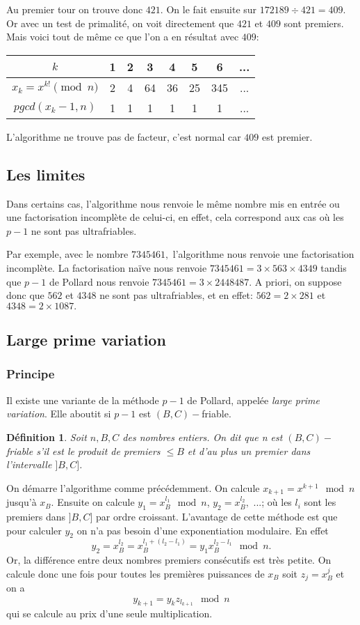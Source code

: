 \documentclass[french, 12pt, titlepage]{article}
\newtheorem{definition}{D{\'e}finition}
\begin{document}
Au premier tour on trouve donc $421.$ On le fait ensuite sur $172189 \div 421 = 409.$ Or avec un test de primalité, on voit directement que $421$ et $409$ sont premiers. Mais voici tout de même ce que l'on a en résultat avec $409:$ 

\begin{center}
\begin{tabular}{|c||c|c|c|c|c|c|c|}
\hline
$k$ & 1 & 2 & 3 & 4 & 5 & 6 & ... \\
\hline
$x_k = x^{k!} \pmod n$ & 2 & 4 & 64 & 36 & 25 & 345 & ... \\
\hline
$pgcd(x_k -1, n)$ & 1 & 1 & 1 & 1 & 1 & 1 & ...\\
\hline
\end{tabular}
\end{center}

L'algorithme ne trouve pas de facteur, c'est normal car $409$ est premier.

\subsection{Les limites}

Dans certains cas, l'algorithme nous renvoie le même nombre mis en entrée ou une factorisation incomplète de celui-ci, en effet, cela correspond aux cas où les $p-1$ ne sont pas ultrafriables.

Par exemple, avec le nombre $7345461,$ l'algorithme nous renvoie une factorisation incomplète.
La factorisation naïve nous renvoie $7345461 = 3 \times 563 \times 4349$ tandis que $p-1$ de Pollard nous renvoie $7345461 = 3 \times 2448487.$
A priori, on suppose donc que $562$ et $4348$ ne sont pas ultrafriables, et en effet:
$562 = 2 \times 281$ et $4348 = 2 \times 1087.$

\subsection{Large prime variation}
\subsubsection{Principe}
Il existe une variante de la méthode $p - 1$ de Pollard, appelée \textit{large prime variation}. 
Elle aboutit si $p - 1$ est $(B, C)-$friable.

\begin{definition}
  Soit $n, B, C$ des nombres entiers. On dit que n est $(B, C)-$friable s'il est le produit de premiers $\leq B$ et d'au plus un premier dans l'intervalle $]B, C]$.
\end{definition}
On démarre l'algorithme comme précédemment. On calcule $x_{k + 1} = x^{k + 1} \mod n$ jusqu'à $x_B.$ Ensuite on calcule $y_1 = x_B^{l_1} \mod n$, $y_2 = x_B^{l_2},$ ...; où les $l_i$ sont les premiers dans $]B,C]$ par ordre croissant.
L'avantage de cette méthode est que pour calculer $y_2$ on n'a pas besoin d'une exponentiation modulaire. En effet \[ y_2 = x_B^{l_2} = x_B^{l_1 + (l_2 - l_1)} = y_1 x_B^{l_2 - l_1} \mod n.\]
Or, la différence entre deux nombres premiers consécutifs est très petite. On calcule donc une fois pour toutes les premières puissances de $x_B$ soit $z_j = x_B^j$ et on a \[ y_{k + 1} = y_k z_{l_{k+1}} \mod n \] qui se calcule au prix d'une seule multiplication.
\end{document}

